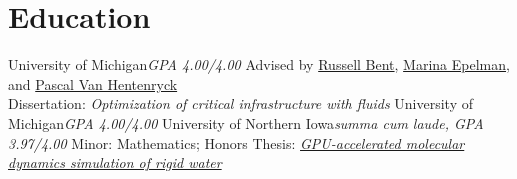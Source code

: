 \section{Education}
		{University of Michigan}{}{\textit{GPA 4.00/4.00}}
		{Advised by \href{https://public.lanl.gov/rbent}{Russell Bent}, \href{http://www-personal.umich.edu/~mepelman}{Marina Epelman}, and \href{https://sites.gatech.edu/pascal-van-hentenryck}{Pascal Van Hentenryck} \\ Dissertation: \textit{Optimization of critical infrastructure with fluids}}
		{University of Michigan}{}{\textit{GPA 4.00/4.00}}{}
		{University of Northern Iowa}{}{\textit{summa cum laude, GPA 3.97/4.00}}
		{Minor: Mathematics; Honors Thesis: \href{http://byron.tasseff.com/documents/reports/2012-gpu_accelerated_molecular_dynamics_simulation_of_rigid_water.pdf}{\textit{GPU-accelerated molecular dynamics simulation of rigid water}}}
